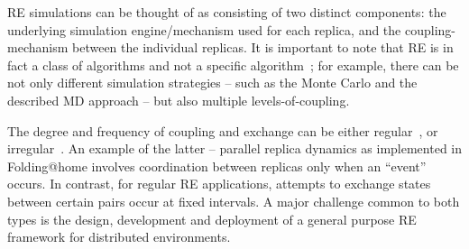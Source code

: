 \documentclass{rspublic}
\begin{document}
RE simulations can be thought of as consisting of
two distinct components: the underlying simulation engine/mechanism
used for each replica, and the coupling-mechanism between the
individual replicas.  It is important to note that RE is in fact a
class of algorithms and not a specific
algorithm~\citep{dpa-paper}; for example, there can be not only
different simulation strategies -- such as the Monte Carlo and the
described MD approach -- but also multiple levels-of-coupling.  

The degree and frequency of coupling and exchange can be either
regular~\citep{hansmann,Sugita:1999rm}, or
irregular~\citep{PhysRevLett.86.4983,pande_bj03}. An example of the latter --
parallel replica dynamics as implemented in Folding@home
\citep{folding} involves coordination between replicas only when an
``event'' occurs.  In contrast, for regular RE applications, attempts
to exchange states between certain pairs occur at fixed intervals. A
major challenge common to both types is the design,
development and deployment of a general purpose RE framework for
distributed environments.
\end{document}
